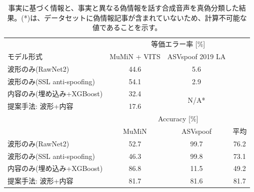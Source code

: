 
\begin{table}[h]
    \caption{事実に基づく情報と、事実と異なる偽情報を話す合成音声を真偽分類した結果。(*)は、データセットに偽情報記事が含まれていないため、計算不可能な値であることを示す。}
    \centering
    \begin{tabular}{lccc}\hline
         & \multicolumn{3}{c}{等価エラー率 [\%]} \\
       モデル形式 & MuMiN + VITS & ASVspoof 2019 LA \\\hline\hline
       波形のみ(RawNet2) & 44.6 & 5.6 & \\
       波形のみ(SSL anti-spoofing) & 54.1 & 2.9 & \\\hline
       内容のみ(埋め込み+XGBoost) & 32.4 & \multirow{2}{*}{N/A*} & \\
       提案手法: 波形+内容 & 17.6 & &\\\hline\hline
       & \multicolumn{3}{c}{Accuracy [\%]}\\
       & MuMiN & ASVspoof & 平均\\\hline
       波形のみ(RawNet2) & 52.7 & 99.7 & 76.2\\
       波形のみ(SSL anti-spoofing) & 46.3 & 99.8 & 73.1 \\
       内容のみ(埋め込み+XGBoost) & 86.8 & 11.5 & 49.2\\
       提案手法: 波形+内容 & 81.7 & 81.6 & 81.7 \\\hline\hline
    \end{tabular}
    \label{tab:result}
\end{table}

